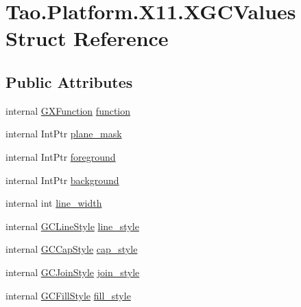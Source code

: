 \hypertarget{struct_tao_1_1_platform_1_1_x11_1_1_x_g_c_values}{
\section{Tao.Platform.X11.XGCValues Struct Reference}
\label{struct_tao_1_1_platform_1_1_x11_1_1_x_g_c_values}
}
\subsection*{Public Attributes}
\begin{DoxyCompactItemize}
\item 
internal \hyperlink{namespace_tao_1_1_platform_1_1_x11_a7c2cb72fda9a0353ade9645fc8dce93a}{GXFunction} \hyperlink{struct_tao_1_1_platform_1_1_x11_1_1_x_g_c_values_a60eb1d987559441cd8c8570739a04cc8}{function}
\item 
internal IntPtr \hyperlink{struct_tao_1_1_platform_1_1_x11_1_1_x_g_c_values_a78864ed3d0e25826c953e90c7726c891}{plane\_\-mask}
\item 
internal IntPtr \hyperlink{struct_tao_1_1_platform_1_1_x11_1_1_x_g_c_values_a51460c7b550241e1fcc90ef8cb8fb830}{foreground}
\item 
internal IntPtr \hyperlink{struct_tao_1_1_platform_1_1_x11_1_1_x_g_c_values_adcb5fa9a3528a5ca99a99b4d8386a438}{background}
\item 
internal int \hyperlink{struct_tao_1_1_platform_1_1_x11_1_1_x_g_c_values_a23c25a39270d586d869fbee251c7cf01}{line\_\-width}
\item 
internal \hyperlink{namespace_tao_1_1_platform_1_1_x11_afb19e1487e9b29fd5878cd5204bba235}{GCLineStyle} \hyperlink{struct_tao_1_1_platform_1_1_x11_1_1_x_g_c_values_ad7a5ffead4bf997e80679343bfab1bd7}{line\_\-style}
\item 
internal \hyperlink{namespace_tao_1_1_platform_1_1_x11_a247757ccd4bd40633ef1f77f6c1f6b7d}{GCCapStyle} \hyperlink{struct_tao_1_1_platform_1_1_x11_1_1_x_g_c_values_a3e04a0a163c0a2c6efc5ee17e685f7ee}{cap\_\-style}
\item 
internal \hyperlink{namespace_tao_1_1_platform_1_1_x11_a64ee028d31b794a42366f2e88e1a7fd5}{GCJoinStyle} \hyperlink{struct_tao_1_1_platform_1_1_x11_1_1_x_g_c_values_a4ddbd40fd5659cd802d37bf514aeed8c}{join\_\-style}
\item 
internal \hyperlink{namespace_tao_1_1_platform_1_1_x11_ac481b918d1a8a960a0db66431e32e534}{GCFillStyle} \hyperlink{struct_tao_1_1_platform_1_1_x11_1_1_x_g_c_values_ad79016bdbbda2985e2504aba602d929b}{fill\_\-style}

\end{DoxyCompactItemize}

